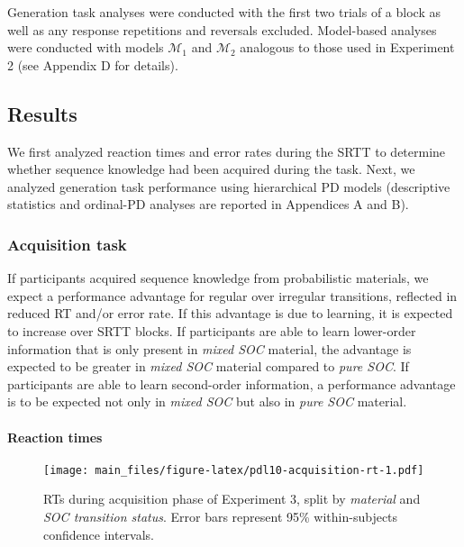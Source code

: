 \documentclass[floatsintext,doc]{apa6}
\theoremstyle{definition}
\theoremstyle{definition}
\theoremstyle{definition}
\theoremstyle{remark}
\begin{document}
Generation task analyses were conducted with the first two trials of a
block as well as any response repetitions and reversals excluded.
Model-based analyses were conducted with models \(\mathcal{M}_1\) and
\(\mathcal{M}_2\) analogous to those used in Experiment 2 (see Appendix
D for details).

\subsection{Results}\label{results-2}

We first analyzed reaction times and error rates during the SRTT to
determine whether sequence knowledge had been acquired during the task.
Next, we analyzed generation task performance using hierarchical PD
models (descriptive statistics and ordinal-PD analyses are reported in
Appendices A and B).

\subsubsection{Acquisition task}\label{acquisition-task-2}

If participants acquired sequence knowledge from probabilistic
materials, we expect a performance advantage for regular over irregular
transitions, reflected in reduced RT and/or error rate. If this
advantage is due to learning, it is expected to increase over SRTT
blocks. If participants are able to learn lower-order information that
is only present in \emph{mixed SOC} material, the advantage is expected
to be greater in \emph{mixed SOC} material compared to \emph{pure SOC}.
If participants are able to learn second-order information, a
performance advantage is to be expected not only in \emph{mixed SOC} but
also in \emph{pure SOC} material.

\paragraph{Reaction times}\label{reaction-times-2}

\begin{figure}
\centering
\texttt{[image: main\_files/figure-latex/pdl10-acquisition-rt-1.pdf]}
\caption{\label{fig:pdl10-acquisition-rt}RTs during acquisition phase of
Experiment 3, split by \emph{material} and \emph{SOC transition status}.
Error bars represent 95\% within-subjects confidence intervals.}
\end{figure}
\end{document}
